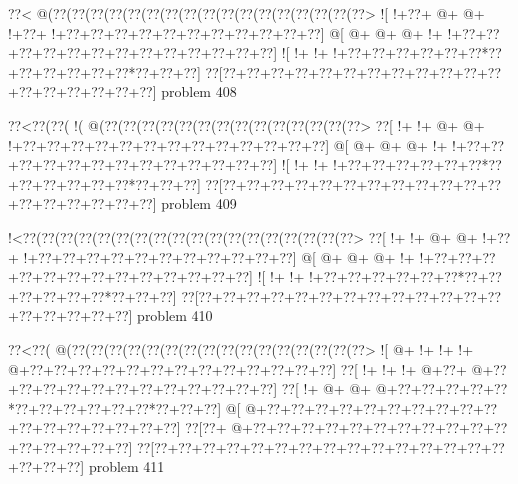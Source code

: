 \vbox{\vbox{\goo
\0??<\- @(\0??(\0??(\0??(\0??(\0??(\0??(\0??(\0??(\0??(\0??(\0??(\0??(\0??(\0??(\0??(\0??(\0??>
\- ![\- !+\0??+\- @+\- @+\- !+\0??+\- !+\0??+\0??+\0??+\0??+\0??+\0??+\0??+\0??+\0??+\0??+\0??]
\- @[\- @+\- @+\- @+\- !+\- !+\0??+\0??+\0??+\0??+\0??+\0??+\0??+\0??+\0??+\0??+\0??+\0??+\0??]
\- ![\- !+\- !+\- !+\0??+\0??+\0??+\0??+\0??+\0??*\0??+\0??+\0??+\0??+\0??+\0??*\0??+\0??+\0??]
\0??[\0??+\0??+\0??+\0??+\0??+\0??+\0??+\0??+\0??+\0??+\0??+\0??+\0??+\0??+\0??+\0??+\0??+\0??]
}
\hfil problem 408\hfil\break
}



\vbox{\vbox{\goo
\0??<\0??(\0??(\- !(\- @(\0??(\0??(\0??(\0??(\0??(\0??(\0??(\0??(\0??(\0??(\0??(\0??(\0??(\0??>
\0??[\- !+\- !+\- @+\- @+\- !+\0??+\0??+\0??+\0??+\0??+\0??+\0??+\0??+\0??+\0??+\0??+\0??+\0??]
\- @[\- @+\- @+\- @+\- !+\- !+\0??+\0??+\0??+\0??+\0??+\0??+\0??+\0??+\0??+\0??+\0??+\0??+\0??]
\- ![\- !+\- !+\- !+\0??+\0??+\0??+\0??+\0??+\0??*\0??+\0??+\0??+\0??+\0??+\0??*\0??+\0??+\0??]
\0??[\0??+\0??+\0??+\0??+\0??+\0??+\0??+\0??+\0??+\0??+\0??+\0??+\0??+\0??+\0??+\0??+\0??+\0??]
}
\hfil problem 409\hfil\break
}



\vbox{\vbox{\goo
\- !<\0??(\0??(\0??(\0??(\0??(\0??(\0??(\0??(\0??(\0??(\0??(\0??(\0??(\0??(\0??(\0??(\0??(\0??>
\0??[\- !+\- !+\- @+\- @+\- !+\0??+\- !+\0??+\0??+\0??+\0??+\0??+\0??+\0??+\0??+\0??+\0??+\0??]
\- @[\- @+\- @+\- @+\- !+\- !+\0??+\0??+\0??+\0??+\0??+\0??+\0??+\0??+\0??+\0??+\0??+\0??+\0??]
\- ![\- !+\- !+\- !+\0??+\0??+\0??+\0??+\0??+\0??*\0??+\0??+\0??+\0??+\0??+\0??*\0??+\0??+\0??]
\0??[\0??+\0??+\0??+\0??+\0??+\0??+\0??+\0??+\0??+\0??+\0??+\0??+\0??+\0??+\0??+\0??+\0??+\0??]
}
\hfil problem 410\hfil\break
}



\vbox{\vbox{\goo
\0??<\0??(\- @(\0??(\0??(\0??(\0??(\0??(\0??(\0??(\0??(\0??(\0??(\0??(\0??(\0??(\0??(\0??(\0??>
\- ![\- @+\- !+\- !+\- !+\- @+\0??+\0??+\0??+\0??+\0??+\0??+\0??+\0??+\0??+\0??+\0??+\0??+\0??]
\0??[\- !+\- !+\- !+\- @+\0??+\- @+\0??+\0??+\0??+\0??+\0??+\0??+\0??+\0??+\0??+\0??+\0??+\0??]
\0??[\- !+\- @+\- @+\- @+\0??+\0??+\0??+\0??+\0??*\0??+\0??+\0??+\0??+\0??+\0??*\0??+\0??+\0??]
\- @[\- @+\0??+\0??+\0??+\0??+\0??+\0??+\0??+\0??+\0??+\0??+\0??+\0??+\0??+\0??+\0??+\0??+\0??]
\0??[\0??+\- @+\0??+\0??+\0??+\0??+\0??+\0??+\0??+\0??+\0??+\0??+\0??+\0??+\0??+\0??+\0??+\0??]
\0??[\0??+\0??+\0??+\0??+\0??+\0??+\0??+\0??+\0??+\0??+\0??+\0??+\0??+\0??+\0??+\0??+\0??+\0??]
}
\hfil problem 411\hfil\break
}



